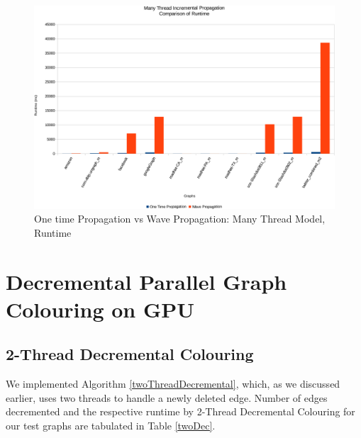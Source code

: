 \documentclass[MTech]{iitmdiss}
\begin{document}
\begin{figure}[h]
    \centering
    \includegraphics[width=\textwidth,keepaspectratio=true]{chartNewest35.pdf}
    \caption{
        One time Propagation vs Wave Propagation: Many Thread Model, Runtime
    }
    \label{fig:chart20}
\end{figure}

\section{Decremental Parallel Graph Colouring on GPU}
\subsection{2-Thread Decremental Colouring}
We implemented Algorithm \ref{twoThreadDecremental}, which, as we discussed earlier, uses two threads to handle a newly deleted edge. Number of edges decremented and the respective runtime by 2-Thread Decremental Colouring for our test graphs are tabulated in Table \ref{twoDec}.
\end{document}
